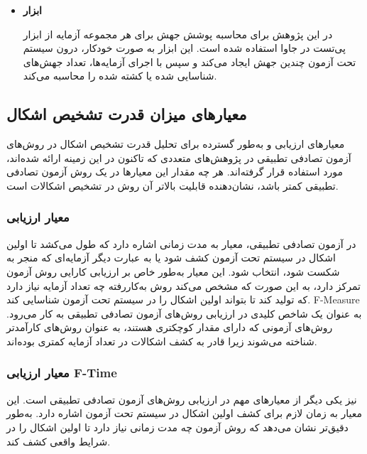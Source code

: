 \begin{itemize}
\item \textbf{ابزار}

در این پژوهش برای محاسبه پوشش جهش برای هر مجموعه آزمایه از ابزار پی‌تست
در جاوا استفاده شده است. این ابزار به صورت خودکار، درون سیستم تحت آزمون چندین جهش ایجاد می‌کند و سپس با اجرای آزمایه‌ها، تعداد جهش‌های شناسایی شده یا کشته شده را محاسبه می‌کند.

\end{itemize}

\subsection{معیارهای میزان قدرت تشخیص اشکال}
معیارهای ارزیابی  و  به‌طور گسترده برای تحلیل قدرت تشخیص اشکال در روش‌های آزمون تصادفی تطبیقی در پژوهش‌های متعددی که تاکنون در این زمینه ارائه شده‌اند، مورد استفاده قرار گرفته‌اند. هر چه مقدار این معیارها در یک روش آزمون تصادفی تطبیقی کمتر باشد، نشان‌دهنده قابلیت بالاتر آن روش در تشخیص اشکالات است.

\subsubsection{معیار ارزیابی }

در آزمون تصادفی تطبیقی، معیار  به مدت زمانی اشاره دارد که طول می‌کشد تا اولین اشکال در سیستم تحت آزمون کشف شود یا به عبارت دیگر آزمایه‌ای که منجر به شکست شود، انتخاب شود. این معیار به‌طور خاص بر ارزیابی کارایی روش آزمون تمرکز دارد، به این صورت که مشخص می‌کند روش به‌کاررفته چه تعداد آزمایه نیاز دارد که تولید کند تا بتواند اولین اشکال را در سیستم تحت آزمون شناسایی کند. F-Measure به عنوان یک شاخص کلیدی در ارزیابی روش‌های آزمون تصادفی تطبیقی به کار می‌رود. روش‌های آزمونی که دارای مقدار  کوچکتری هستند، به عنوان روش‌های کارآمدتر شناخته می‌شوند زیرا قادر به کشف اشکالات در تعداد آزمایه کمتری بوده‌اند.

\subsubsection{معیار ارزیابی F-Time}

 نیز یکی دیگر از معیارهای مهم در ارزیابی روش‌های آزمون تصادفی تطبیقی است. این معیار به زمان لازم برای کشف اولین اشکال در سیستم تحت آزمون اشاره دارد.  به‌طور دقیق‌تر نشان می‌دهد که روش آزمون چه مدت زمانی نیاز دارد تا اولین اشکال را در شرایط واقعی کشف کند.

